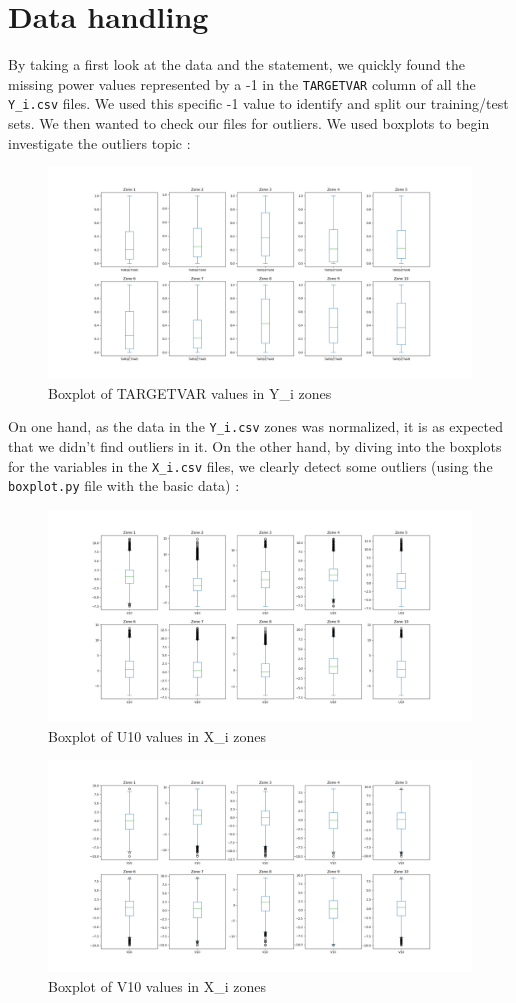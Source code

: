\section{Data handling}

By taking a first look at the data and the statement, we quickly found the missing power values represented by a -1 in the \verb|TARGETVAR| column of all the \verb|Y_i.csv| files. We used this specific -1 value to identify and split our training/test sets. We then wanted to check our files for outliers. We used boxplots to begin investigate the outliers topic :

\begin{figure}[!h]
    \centering
    \includegraphics[width=.6\textwidth]{figs/boxplots_Y.png}
    \caption{Boxplot of TARGETVAR values in Y\_i zones}
    \label{fig:boxplot_Y}
\end{figure}

On one hand, as the data in the \verb|Y_i.csv| zones was normalized, it is as expected that we didn't find outliers in it. On the other hand, by diving into the boxplots for the variables in the \verb|X_i.csv| files, we clearly detect some outliers (using the \verb|boxplot.py| file with the basic data) : 

\begin{figure}[H]
    \centering
    \includegraphics[width=.7\textwidth]{figs/boxplots_X_u10.png}
    \caption{Boxplot of U10 values in X\_i zones}
    \label{fig:boxplot_X_u10}
\end{figure}

\begin{figure}[H]
    \centering
    \includegraphics[width=.7\textwidth]{figs/boxplots_X_v10.png}
    \caption{Boxplot of V10 values in X\_i zones}
    \label{fig:boxplot_X_v10}
\end{figure}

